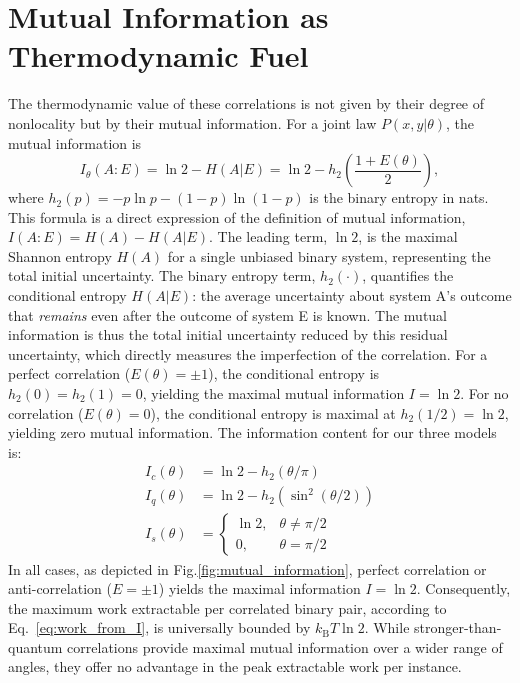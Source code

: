 \documentclass[%
  reprint,
  showpacs,
  showkeys,
  pra,
  longbibliography,
  floatfix,
  x11names
]{revtex4-2}
\begin{document}
\section{Mutual Information as Thermodynamic Fuel}
The thermodynamic value of these correlations is not given by their degree of nonlocality but by their mutual information. For a joint law $P(x,y|\theta)$, the mutual information is
\begin{equation}
I_\theta(A:E) = \ln 2 - H(A|E) = \ln 2 - h_2\left(\frac{1+E(\theta)}{2}\right),
\label{eq:Itheta}
\end{equation}
where $h_2(p)=-p\ln p-(1-p)\ln(1-p)$ is the binary entropy in nats. This formula is a direct expression of the definition of mutual information, $I(A:E) = H(A) - H(A|E)$. The leading term, $\ln 2$, is the maximal Shannon entropy $H(A)$ for a single unbiased binary system, representing the total initial uncertainty. The binary entropy term, $h_2(\cdot)$, quantifies the conditional entropy $H(A|E)$: the average uncertainty about system A's outcome that \emph{remains} even after the outcome of system E is known. The mutual information is thus the total initial uncertainty reduced by this residual uncertainty, which directly measures the imperfection of the correlation. For a perfect correlation ($E(\theta) = \pm 1$), the conditional entropy is $h_2(0)=h_2(1)=0$, yielding the maximal mutual information $I=\ln 2$. For no correlation ($E(\theta) = 0$), the conditional entropy is maximal at $h_2(1/2)=\ln 2$, yielding zero mutual information. The information content for our three models is:
\begin{align}
I_c(\theta) &= \ln 2 - h_2(\theta/\pi) \\
I_q(\theta) &= \ln 2 - h_2(\sin^2(\theta/2)) \\
I_s(\theta) &= \begin{cases} \ln 2, & \theta\neq \pi/2 \\ 0, & \theta = \pi/2 \end{cases}
\end{align}
In all cases, as depicted in Fig.\ref{fig:mutual_information}, perfect correlation or anti-correlation ($E=\pm 1$) yields the maximal information $I=\ln 2$. Consequently, the maximum work extractable per correlated binary pair, according to Eq.~\eqref{eq:work_from_I}, is universally bounded by $k_{\mathrm{B}}T\ln 2$. While stronger-than-quantum correlations provide maximal mutual information over a wider range of angles, they offer no advantage in the peak extractable work per instance.
\end{document}
